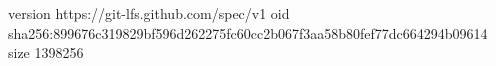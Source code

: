 version https://git-lfs.github.com/spec/v1
oid sha256:899676c319829bf596d262275fc60cc2b067f3aa58b80fef77dc664294b09614
size 1398256
